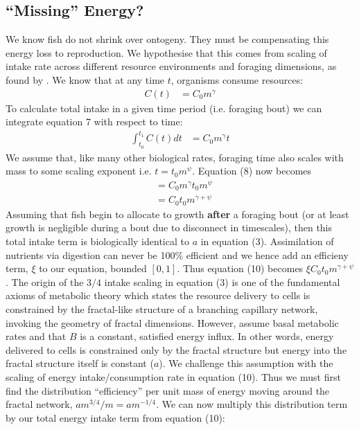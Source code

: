 \documentclass[a3paper]{article} %
\begin{document}
\begin{multicols}{2}
\section{``Missing'' Energy?}
We know fish do not shrink over ontogeny. They must be compensating this energy loss to reproduction. We hypothesise that this comes from scaling of intake rate across different resource environments and foraging dimensions, as found by \cite{Pawar2012}. We know that at any time $t$, organisms consume resources:
\begin{align}
    C(t) &= C_{0}m^{\gamma}
\end{align}
To calculate total intake in a given time period (i.e. foraging bout) we can integrate equation 7 with respect to time:
\begin{align}
    \int_{t_{0}}^{t_{1}}C(t)dt &= C_{0}m^{\gamma}t
\end{align}
We assume that, like many other biological rates, foraging time also scales with mass to some scaling exponent i.e. $t = t_{0}m^{\psi}$. Equation (8) now becomes
\begin{align}
    &= C_{0}m^{\gamma}t_{0}m^{\psi} \\
    &= C_{0}t_{0}m^{\gamma + \psi}
\end{align}
Assuming that fish begin to allocate to growth \textbf{after} a foraging bout (or at least growth is negligible during a bout due to disconnect in timescales), then this total intake term is biologically identical to $a$ in equation (3). Assimilation of nutrients via digestion can never be 100\% efficient and we hence add an efficieny term, $\xi$ to our equation, bounded $[0,1]$. Thus equation (10) becomes $\xi C_{0}t_{0}m^{\gamma + \psi}$. The origin of the $3/4$ intake scaling in equation (3) is one of the fundamental axioms of metabolic theory \autocite{West1997a,West2001} which states the resource delivery to cells is constrained by the fractal-like structure of a branching capillary network, invoking the geometry of fractal dimensions. However, \cite{West2001} assume basal metabolic rates and that $B$ is a constant, satisfied energy influx. In other words, energy delivered to cells is constrained only by the fractal structure but energy into the fractal structure itself is constant ($a$). We challenge this assumption with the scaling of energy intake/consumption rate in equation (10). Thus we must first find the distribution ``efficiency'' per unit mass of energy moving around the fractal network, ${am^{3/4}}/m = am^{-1/4}$. We can now multiply this distribution term by our total energy intake term from equation (10):

\end{multicols}
\end{document}
